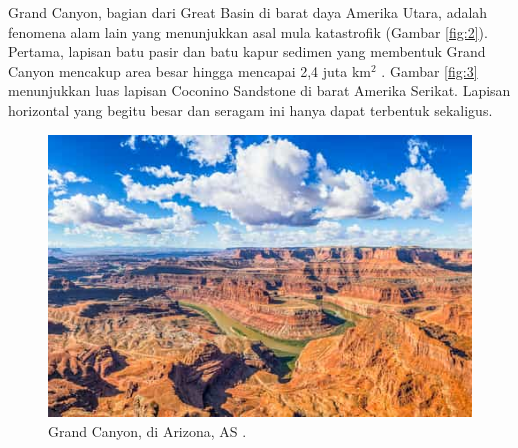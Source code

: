 \documentclass[10pt,twocolumn,letterpaper]{article}
\begin{document}
Grand Canyon, bagian dari Great Basin di barat daya Amerika Utara, adalah fenomena alam lain yang menunjukkan asal mula katastrofik (Gambar \ref{fig:2}). Pertama, lapisan batu pasir dan batu kapur sedimen yang membentuk Grand Canyon mencakup area besar hingga mencapai 2,4 juta km$^2$ \cite{21}. Gambar \ref{fig:3} menunjukkan luas lapisan Coconino Sandstone di barat Amerika Serikat. Lapisan horizontal yang begitu besar dan seragam ini hanya dapat terbentuk sekaligus.

\begin{figure}[t]
\begin{center}
   \includegraphics[width=1\linewidth]{grand-canyon.jpg}
\end{center}
   \caption{Grand Canyon, di Arizona, AS \cite{49}.}
\label{fig:2}
\label{fig:onecol}
\end{figure}
\end{document}

